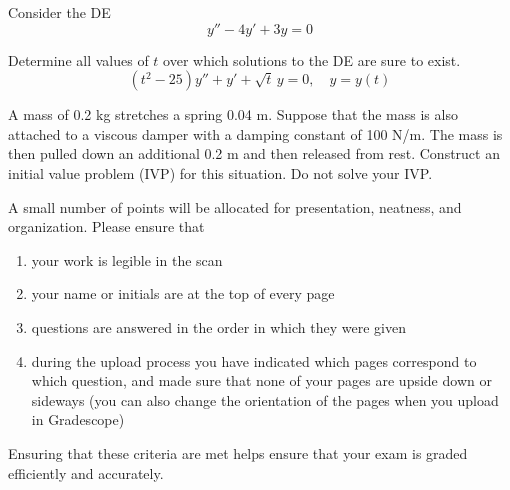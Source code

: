 \documentclass[12pt]{exam}
\begin{document}
\begin{questions}
\begin{parts}
        \end{parts}

\newpage 
    \question[7] Consider the DE $$y''-4y'+3y = 0$$
    
    \newpage 
    \question[2] Determine all values of $t$ over which solutions to the DE are sure to exist. $$(t^2-25)y''+ y'+\sqrt{t}\, y = 0, \quad y=y(t)$$ %

    \vspace{6cm}
    
    \question[2] A mass of 0.2 kg stretches a spring 0.04 m. Suppose that the mass is also attached to a viscous damper with a damping constant of 100 N/m. The mass is then pulled down an additional 0.2 m and then released from rest. Construct an initial value problem (IVP) for this situation. Do not solve your IVP.
    
    \newpage

    \question[1] A small number of points will be allocated for presentation, neatness, and organization. Please ensure that
    \begin{enumerate}
        \item your work is legible in the scan
        \item your name or initials are at the top of every page
        \item questions are answered in the order in which they were given
        \item during the upload process you have indicated which pages correspond to which question, and made sure that none of your pages are upside down or sideways (you can also change the orientation of the pages when you upload in Gradescope)
    \end{enumerate}
    Ensuring that these criteria are met helps ensure that your exam is graded efficiently and accurately. 
    

    
\end{questions}
    
\end{document}

